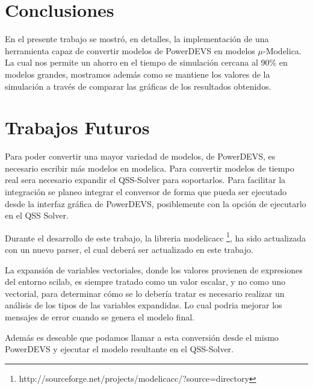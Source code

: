 
\section{Conclusiones}

	En el presente trabajo se mostró, en detalles, la implementación de una herramienta capaz de convertir modelos de PowerDEVS en modelos $\mu$-Modelica.  
	La cual nos permite un ahorro en el tiempo de simulación cercana al 90\% en modelos grandes, mostramos además como se mantiene los valores de la 
	simulación a través de comparar las gráficas de los resultados obtenidos.

\section{Trabajos Futuros}
	Para poder convertir una mayor variedad de modelos, de PowerDEVS, es necesario escribir más modelos en modelica.
	Para convertir modelos de tiempo real sera necesario expandir el QSS-Solver para soportarlos.
	Para facilitar la integración se planeo integrar el conversor de forma que pueda ser ejecutado desde la interfaz gráfica de PowerDEVS, posiblemente 
	con la opción de ejecutarlo en el QSS Solver.

	Durante el desarrollo de este trabajo, la libreria modelicacc \footnote{http://sourceforge.net/projects/modelicacc/?source=directory}, ha sido actualizada 
	con un nuevo parser, el cual deberá ser actualizado en este trabajo.

	La expansión de variables vectoriales, donde los valores provienen de expresiones del entorno scilab, es siempre tratado como un valor escalar, y no como 
	uno vectorial, para determinar cómo se lo debería tratar es necesario realizar un análisis de los tipos de las variables expandidas. 
	Lo cual podria mejorar los mensajes de error cuando se genera el modelo final.

	Además es deseable que podamos llamar a esta conversión desde el mismo PowerDEVS y ejecutar el modelo resultante en el QSS-Solver.

